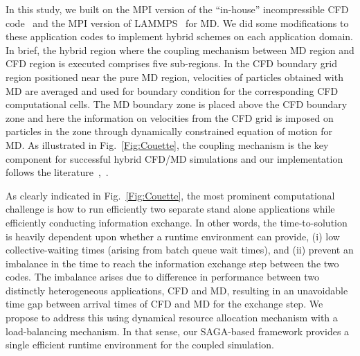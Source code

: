 \documentclass[conference,final]{IEEEtran}
\begin{document}
In this study, we built on the MPI version of the ``in-house''
incompressible CFD code~\cite{Lee} and the MPI version of
LAMMPS~\cite{LAMMPS} for MD. We did some modifications to these
application codes to implement hybrid schemes on each application
domain. In brief, the hybrid region where the coupling mechanism
between MD region and CFD region is executed comprises five
sub-regions. In the CFD boundary grid region positioned near the pure
MD region, velocities of particles obtained with MD are averaged and
used for boundary condition for the corresponding CFD computational
cells. The MD boundary zone is placed above the CFD boundary zone and
here the information on velocities from the CFD grid is imposed on
particles in the zone through dynamically constrained equation of
motion for MD. As illustrated in Fig.~\ref{Fig:Couette}, the coupling
mechanism is the key component for successful hybrid CFD/MD
simulations and our implementation follows the
literature~\cite{Nie},~\cite{Yen}.



As clearly indicated in Fig.~\ref{Fig:Couette}, the most prominent
computational challenge is how to run efficiently two separate stand
alone applications while efficiently conducting information exchange.
In other words, the time-to-solution is heavily dependent upon whether
a runtime environment can provide, (i) low collective-waiting times
(arising from batch queue wait times), and (ii) prevent an imbalance
in the time to reach the information exchange step between the two codes. The
imbalance arises due to difference in performance between two distinctly
heterogeneous applications, CFD and MD, resulting in an unavoidable
time gap between arrival times of CFD and MD for the exchange step. We
propose to address this using dynamical resource allocation mechanism
with a load-balancing mechanism. In that sense, our SAGA-based
framework provides a single efficient runtime environment for the
coupled simulation.
\end{document}
